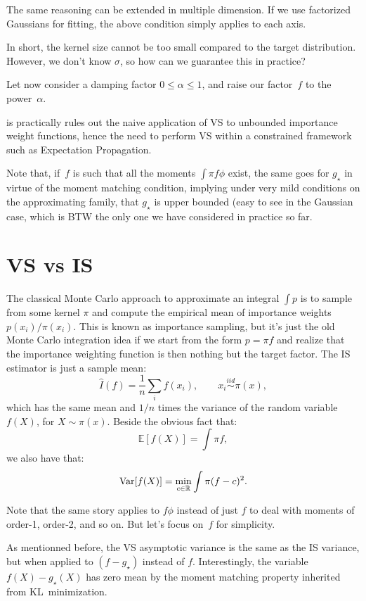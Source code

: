 \documentclass{article}
\begin{document}
The same reasoning can be extended in multiple dimension. If we use factorized Gaussians for fitting, the above condition simply applies to each axis.

In short, the kernel size cannot be too small compared to the target distribution. However, we don't know $\sigma$, so how can we guarantee this in practice? 

Let now consider a damping factor $0\leq \alpha \leq 1$, and raise our factor~$f$ to the power~$\alpha$. 


is practically rules out the naive application of VS to unbounded importance weight functions, hence the need to perform VS within a constrained framework such as Expectation Propagation.



Note that, if~$f$ is such that all the moments $\int\pi f \phi$ exist, the same goes for $g_\star$ in virtue of the moment matching condition, implying under very mild conditions on the approximating family, that $g_\star$ is upper bounded (easy to see in the Gaussian case, which is BTW the only one we have considered in practice so far.






\section{VS vs IS}

The classical Monte Carlo approach to approximate an integral $\int p$ is to sample from some kernel $\pi$ and compute the empirical mean of importance weights $p(x_i)/\pi(x_i)$. This is known as importance sampling, but it's just the old Monte Carlo integration idea if we start from the form $p=\pi f$ and realize that the importance weighting function is then nothing but the target factor. The IS estimator is just a sample mean:
$$
\hat{I}(f) = \frac{1}{n}\sum_i f(x_i),
\qquad x_i \stackrel{iid}{\sim} \pi(x),
$$
which has the same mean and $1/n$ times the variance of the random variable $f(X)$, for $X\sim\pi(x)$. Beside the obvious fact that:
$$
\mathbb{E}[f(X)] = \int\pi f,
$$
we also have that:
$$
{\rm Var}[f(X)]
= \min_{c\in\mathbb{R}} \int \pi (f - c)^2.
$$

Note that the same story applies to $f\phi$ instead of just $f$ to deal with moments of order-1, order-2, and so on. But let's focus on~$f$ for simplicity.

As mentionned before, the VS asymptotic variance is the same as the IS variance, but when applied to $(f-g_\star)$ instead of $f$. Interestingly, the variable $f(X)-g_\star(X)$ has zero mean by the moment matching property inherited from KL~minimization.
\end{document}
